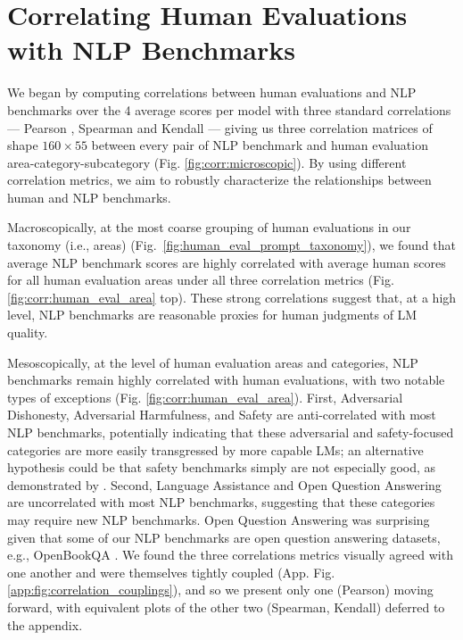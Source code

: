 


\section{Correlating Human Evaluations with NLP Benchmarks}
\label{sec:correlations}

We began by computing correlations between human evaluations and NLP benchmarks over the 4 average scores per model with three standard correlations  --- Pearson \citep{galton1877heredity}, Spearman \citep{spearman1904proof} and Kendall \citep{kendall1938new} --- giving us three correlation matrices of shape $160 \times 55$ between every pair of NLP benchmark and human evaluation area-category-subcategory (Fig. \ref{fig:corr:microscopic}).
By using different correlation metrics, we aim to robustly characterize the relationships between human and NLP benchmarks.

Macroscopically, at the most coarse grouping of human evaluations in our taxonomy (i.e., areas) (Fig.~\ref{fig:human_eval_prompt_taxonomy}), we found that average NLP benchmark scores are highly correlated with average human scores for all human evaluation areas under all three correlation metrics (Fig. \ref{fig:corr:human_eval_area} top).
These strong correlations suggest that, at a high level, NLP benchmarks are reasonable proxies for human judgments of LM quality.

Mesoscopically, at the level of human evaluation areas and categories, NLP benchmarks remain highly correlated with human evaluations, with two notable types of exceptions (Fig. \ref{fig:corr:human_eval_area}). First, Adversarial Dishonesty, Adversarial Harmfulness, and Safety are anti-correlated with most NLP benchmarks, potentially indicating that these adversarial and safety-focused categories are more easily transgressed by more capable LMs; an alternative hypothesis could be that safety benchmarks simply are not especially good, as demonstrated by \citet{ren2024safetywashing}. Second, Language Assistance and Open Question Answering are uncorrelated with most NLP benchmarks, suggesting that these categories may require new NLP benchmarks. Open Question Answering was surprising given that some of our NLP benchmarks are open question answering datasets, e.g., OpenBookQA \citep{mihaylov2018openbookqa}. We found the three correlations metrics visually agreed with one another and were themselves tightly coupled (App. Fig. \ref{app:fig:correlation_couplings}), and so we present only one (Pearson) moving forward, with equivalent plots of the other two (Spearman, Kendall) deferred to the appendix.



